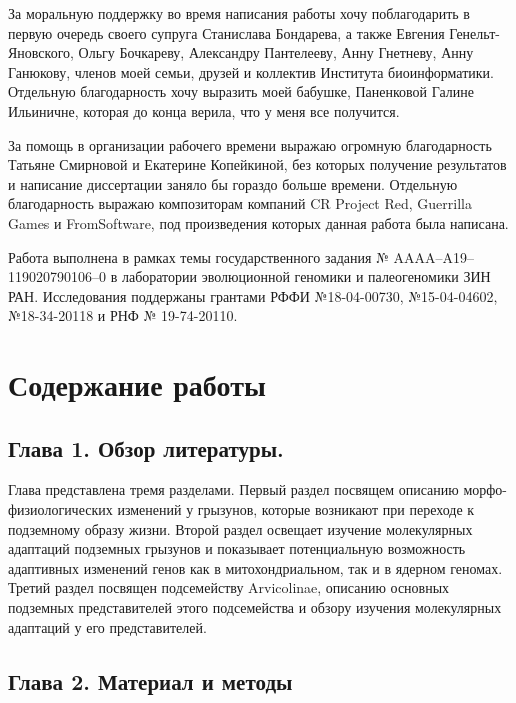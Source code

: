 За моральную поддержку во время написания работы хочу поблагодарить в первую очередь своего супруга Станислава Бондарева, а также Евгения Генельт-Яновского, Ольгу Бочкареву, Александру Пантелееву, Анну Гнетневу, Анну Ганюкову, членов моей семьи, друзей и коллектив Института биоинформатики. Отдельную благодарность хочу выразить моей бабушке, Паненковой Галине Ильиничне, которая до конца верила, что у меня все получится. 

За помощь в организации рабочего времени выражаю огромную благодарность Татьяне Смирновой и Екатерине Копейкиной, без которых получение результатов и написание диссертации заняло бы гораздо больше времени. Отдельную благодарность выражаю композиторам компаний CR Project Red, Guerrilla Games и FromSoftware, под произведения которых данная работа была написана. 

Работа выполнена в рамках темы государственного задания № AAAA–A19–119020790106–0 в лаборатории эволюционной геномики и палеогеномики ЗИН РАН. Исследования поддержаны грантами РФФИ №18-04-00730, №15-04-04602, №18-34-20118 и РНФ № 19-74-20110.


\newpage
\section*{Содержание работы}

\subsection*{Глава 1. Обзор литературы.}
Глава представлена тремя разделами. Первый раздел посвящем описанию морфо-физиологических изменений у грызунов, которые возникают при переходе к подземному образу жизни. Второй раздел освещает изучение молекулярных адаптаций подземных грызунов и показывает потенциальную возможность адаптивных изменений генов как в митохондриальном, так и в ядерном геномах. Третий раздел посвящен подсемейству Arvicolinae, описанию основных подземных представителей этого подсемейства и обзору изучения молекулярных адаптаций у его представителей. 


\subsection*{Глава 2. Материал и методы}

